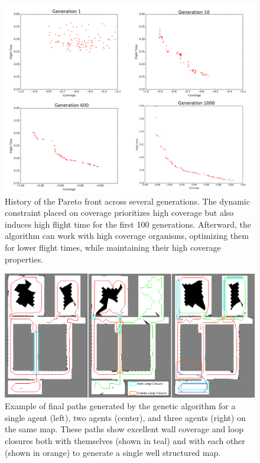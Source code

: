 \documentclass[letterpaper, 10 pt, conference]{ieeeconf}  %
\begin{document}
\begin{figure}
\centering
\includegraphics[width=0.8\linewidth]{figures/pareto_history3.png}
\caption{History of the Pareto front across several generations. The dynamic constraint placed on coverage prioritizes high coverage but also induces high flight time for the first 100 generations. Afterward, the algorithm can work with high coverage organisms, optimizing them for lower flight times, while maintaining their high coverage properties.}
\label{fig:pareto_cheetos}
\end{figure}

\begin{figure}
\centering
\includegraphics[width=1.0\linewidth]{figures/paths.png}
\caption{Example of final paths generated by the genetic algorithm for a single agent (left), two agents (center), and three agents (right) on the same map. These paths show excellent wall coverage and loop closures both with themselves (shown in teal) and with each other (shown in orange) to generate a single well structured map.}
\label{fig:final_paths}
\end{figure}

\end{document}
